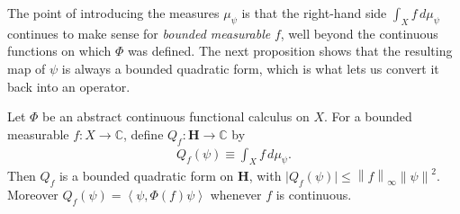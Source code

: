 The point of introducing the measures $\mu_\psi$ is that the right-hand side $\int_X f \, d\mu_\psi$ continues to make sense for \textit{bounded measurable} $f$, well beyond the continuous functions on which $\Phi$ was defined. The next proposition shows that the resulting map of $\psi$ is always a bounded quadratic form, which is what lets us convert it back into an operator.

\begin{proposition}
    \label{prpstn:abstract-extended-forms-are-bounded}
    \leanok
    Let $\Phi$ be an abstract continuous functional calculus on $X$. For a bounded measurable $f : X \to \mathbb{C}$, define $Q_f : \mathbf{H} \to \mathbb{C}$ by
    \begin{align}
        Q_f(\psi) \equiv \int_X f \, d\mu_\psi.
    \end{align}
    Then $Q_f$ is a bounded quadratic form on $\mathbf{H}$, with $\lvert Q_f(\psi) \rvert \le \left\| f \right\|_\infty \left\| \psi \right\|^2$. Moreover $Q_f(\psi) = \left< \psi, \Phi(f)\psi \right>$ whenever $f$ is continuous.
\end{proposition}
